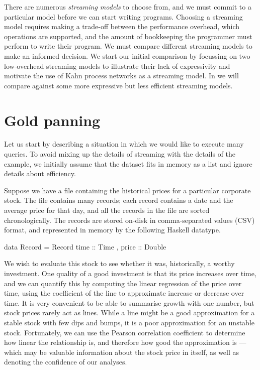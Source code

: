 There are numerous \emph{streaming models} to choose from, and we must commit to a particular model before we can start writing programs.
Choosing a streaming model requires making a trade-off between the performance overhead, which operations are supported, and the amount of bookkeeping the programmer must perform to write their program.
We must compare different streaming models to make an informed decision.
We start our initial comparison by focussing on two low-overhead streaming models to illustrate their lack of expressivity and motivate the use of Kahn process networks as a streaming model.
In  we will compare against some more expressive but less efficient streaming models.

\section{Gold panning}
\label{taxonomy/gold-panning}
Let us start by describing a situation in which we would like to execute many queries.
To avoid mixing up the details of streaming with the details of the example, we initially assume that the dataset fits in memory as a list and ignore details about efficiency.

Suppose we have a file containing the historical prices for a particular corporate stock.
The file contains many records; each record contains a date and the average price for that day, and all the records in the file are sorted chronologically.
The records are stored on-disk in comma-separated values (CSV) format, and represented in memory by the following Haskell datatype.

\begin{haskell}
data Record = Record
 { time  :: Time
 , price :: Double }
\end{haskell}

We wish to evaluate this stock to see whether it was, historically, a worthy investment.
One quality of a good investment is that its price increases over time, and we can quantify this by computing the linear regression of the price over time, using the coefficient of the line to approximate increase or decrease over time.
It is very convenient to be able to summarise growth with one number, but stock prices rarely act as lines.
While a line might be a good approximation for a stable stock with few dips and bumps, it is a poor approximation for an unstable stock.
Fortunately, we can use the Pearson correlation coefficient to determine how linear the relationship is, and therefore how good the approximation is --- which may be valuable information about the stock price in itself, as well as denoting the confidence of our analyses.

